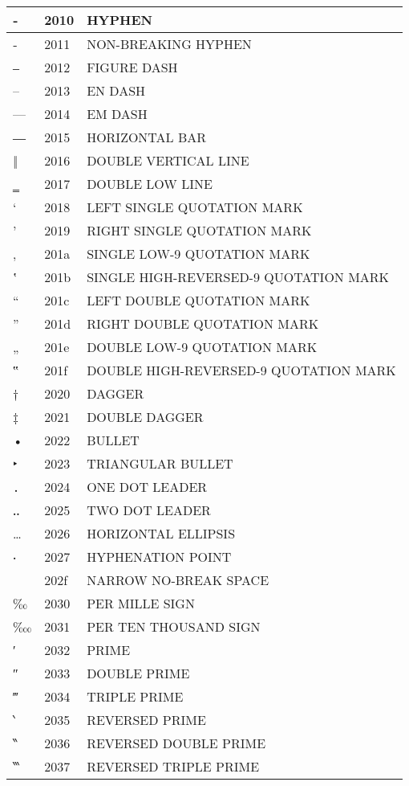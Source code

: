 \documentclass[12pt,letterpaper,openany]{book}
\begin{document}
\begin{center}
\begin{supertabular}{|m{0.25in}|m{0.5in}|m{4in}|}
			‐ & 2010 & HYPHEN\\\hline
			‑ & 2011 & NON-BREAKING HYPHEN\\\hline
			‒ & 2012 & FIGURE DASH\\\hline
			– & 2013 & EN DASH\\\hline
			— & 2014 & EM DASH\\\hline
			― & 2015 & HORIZONTAL BAR\\\hline
			‖ & 2016 & DOUBLE VERTICAL LINE\\\hline
			‗ & 2017 & DOUBLE LOW LINE\\\hline
			‘ & 2018 & LEFT SINGLE QUOTATION MARK\\\hline
			’ & 2019 & RIGHT SINGLE QUOTATION MARK\\\hline
			‚ & 201a & SINGLE LOW-9 QUOTATION MARK\\\hline
			‛ & 201b & SINGLE HIGH-REVERSED-9 QUOTATION MARK\\\hline
			“ & 201c & LEFT DOUBLE QUOTATION MARK\\\hline
			” & 201d & RIGHT DOUBLE QUOTATION MARK\\\hline
			„ & 201e & DOUBLE LOW-9 QUOTATION MARK\\\hline
			‟ & 201f & DOUBLE HIGH-REVERSED-9 QUOTATION MARK\\\hline
			† & 2020 & DAGGER\\\hline
			‡ & 2021 & DOUBLE DAGGER\\\hline
			• & 2022 & BULLET\\\hline
			‣ & 2023 & TRIANGULAR BULLET\\\hline
			․ & 2024 & ONE DOT LEADER\\\hline
			‥ & 2025 & TWO DOT LEADER\\\hline
			… & 2026 & HORIZONTAL ELLIPSIS\\\hline
			‧ & 2027 & HYPHENATION POINT\\\hline
			& 202f & NARROW NO-BREAK SPACE\\\hline
			‰ & 2030 & PER MILLE SIGN\\\hline
			‱ & 2031 & PER TEN THOUSAND SIGN\\\hline
			′ & 2032 & PRIME\\\hline
			″ & 2033 & DOUBLE PRIME\\\hline
			‴ & 2034 & TRIPLE PRIME\\\hline
			‵ & 2035 & REVERSED PRIME\\\hline
			‶ & 2036 & REVERSED DOUBLE PRIME\\\hline
			‷ & 2037 & REVERSED TRIPLE PRIME\\\hline

\end{supertabular}
\end{center}
\end{document}
